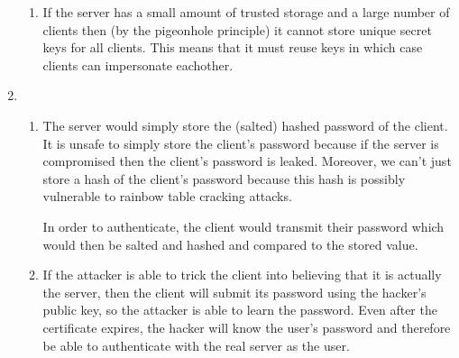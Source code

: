 \documentclass[12pt]{article}
\begin{document}
\begin{enumerate}
\begin{enumerate}
  \item 
    If the server has a small amount of trusted storage and a large number of clients then (by the pigeonhole principle) it cannot store unique secret keys for all clients. This means that it must reuse keys in which case clients can impersonate eachother.
    
  \end{enumerate}

\item 
  
  \begin{enumerate}
  \item 
    The server would simply store the (salted) hashed password of the client. It is unsafe to simply store the client's password because if the server is compromised then the client's password is leaked. Moreover, we can't just store a hash of the client's password because this hash is possibly vulnerable to rainbow table cracking attacks.
    
    In order to authenticate, the client would transmit their password which would then be salted and hashed and compared to the stored value.

  \item 
    If the attacker is able to trick the client into believing that it is actually the server, then the client will submit its password using the hacker's public key, so the attacker is able to learn the password. Even after the certificate expires, the hacker will know the user's password and therefore be able to authenticate with the real server as the user.
    
  \end{enumerate}

  
\end{enumerate}
\end{document}
